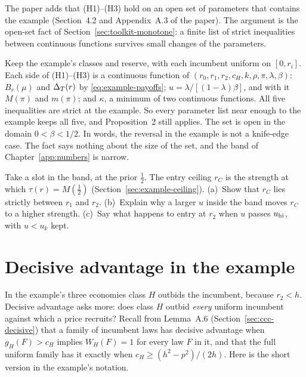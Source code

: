 The paper adds that (H1)--(H3) hold on an open set of parameters that contains the example (Section~4.2 and
Appendix~A.3 of the paper). The argument is the open-set fact of Section~\ref{sec:toolkit-monotone}: a finite list of
strict inequalities between continuous functions survives small changes of the parameters.

Keep the example's classes and reserve, with each incumbent uniform on \([0,r_i]\). Each side of (H1)--(H3)
is a continuous function of \((r_0,r_1,r_2,c_H,k,\rho,\pi,\lambda,\beta)\): \(B_r(\mu)\) and \(\Delta_T(r)\) by
\eqref{eq:example-payoffs}; \(u=\lambda/[(1-\lambda)\beta]\), and with it \(M(\pi)\) and \(m(\pi)\); and
\(\kappa\), a minimum of two continuous functions. All five inequalities are strict at the example. So every
parameter list near enough to the example keeps all five, and Proposition~2 still applies. The set is open in the
domain \(0<\beta<1/2\). In words, the reversal in the example is not a knife-edge case. The fact says nothing about
the size of the set, and the band of Chapter~\ref{app:numbers} is narrow.

\begin{checkyourself}
\label{q:example-ceiling}
Take a slot in the band, at the prior \(\tfrac12\). The entry ceiling \(r_C\) is the strength at which
\(\tau(r)=M(\tfrac12)\) (Section~\ref{sec:example-ceiling}).
(a)~Show that \(r_C\) lies strictly between \(r_1\) and \(r_2\).
(b)~Explain why a larger \(u\) inside the band moves \(r_C\) to a higher strength.
(c)~Say what happens to entry at \(r_2\) when \(u\) passes \(u_{\rm hi}\), with \(u<u_k\) kept.
\end{checkyourself}

\section{Decisive advantage in the example}\label{sec:example-decisive}

In the example's three economies class \(H\) outbids the incumbent, because \(r_2<h\). Decisive advantage asks
more: does class \(H\) outbid \emph{every} uniform incumbent against which a price recruits? Recall from Lemma~A.6
(Section~\ref{sec:ccc-decisive}) that a family of incumbent laws has decisive advantage when \(g_H(F)>c_H\) implies
\(W_H(F)=1\) for every law \(F\) in it, and that the full uniform family has it exactly when
\(c_H\ge(h^2-p^2)/(2h)\). Here is the short version in the example's notation.

